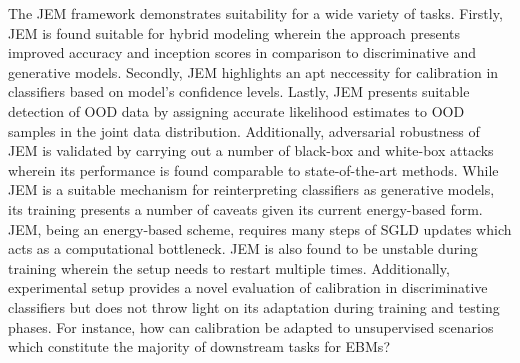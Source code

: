 \documentclass[11pt,letterpaper]{article}
\begin{document}
The JEM framework demonstrates suitability for a wide variety of tasks. Firstly, JEM is found suitable for hybrid modeling wherein the approach presents improved accuracy and inception scores in comparison to discriminative and generative models. Secondly, JEM highlights an apt neccessity for calibration in classifiers based on model's confidence levels. Lastly, JEM presents suitable detection of OOD data by assigning accurate likelihood estimates to OOD samples in the joint data distribution. Additionally, adversarial robustness of JEM is validated by carrying out a number of black-box and white-box attacks wherein its performance is found comparable to state-of-the-art methods. While JEM is a suitable mechanism for reinterpreting classifiers as generative models, its training presents a number of caveats given its current energy-based form. JEM, being an energy-based scheme, requires many steps of SGLD updates which acts as a computational bottleneck. JEM is also found to be unstable during training wherein the setup needs to restart multiple times. Additionally, experimental setup provides a novel evaluation of calibration in discriminative classifiers but does not throw light on its adaptation during training and testing phases. For instance, how can calibration be adapted to unsupervised scenarios which constitute the majority of downstream tasks for EBMs? 
\end{document}
